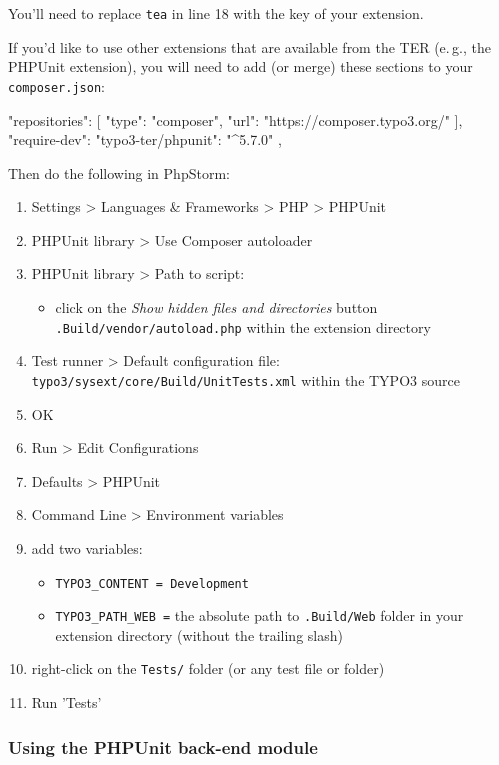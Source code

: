 \documentclass[a4paper,11pt,headsepline]{scrartcl}
\begin{document}
You'll need to replace \texttt{tea} in line 18 with the key of your extension.

If you'd like to use other extensions that are available from the TER (e.\,g., the PHPUnit extension), you will need to add (or merge) these sections to your \texttt{composer.json}:

\begin{jsoncode}
"repositories": [
{
  "type": "composer",
  "url": "https://composer.typo3.org/"
}
],
"require-dev": {
  "typo3-ter/phpunit": "^5.7.0"
},
\end{jsoncode}

Then do the following in PhpStorm:
\begin{enumerate}
  \item Settings > Languages \& Frameworks > PHP > PHPUnit
  \item PHPUnit library > Use Composer autoloader
  \item PHPUnit library > Path to script:
    \begin{itemize}
      \item click on the \emph{Show hidden files and directories} button
      \texttt{.Build/vendor/autoload.php} within the extension directory
    \end{itemize}
  \item Test runner > Default configuration file: \texttt{typo3/sysext/core/Build/UnitTests.xml} within the TYPO3 source
  \item OK
  \item Run > Edit Configurations
  \item Defaults > PHPUnit
  \item Command Line > Environment variables
  \item add two variables:
    \begin{itemize}
      \item \texttt{TYPO3\_CONTENT = Development}
      \item \texttt{TYPO3\_PATH\_WEB =} the absolute path to \texttt{.Build/Web} folder in your extension directory (without the trailing slash)
    \end{itemize}
  \item right-click on the \texttt{Tests/} folder (or any test file or folder)
  \item Run 'Tests'
\end{enumerate}



\subsubsection{Using the PHPUnit back-end module}
\end{document}
